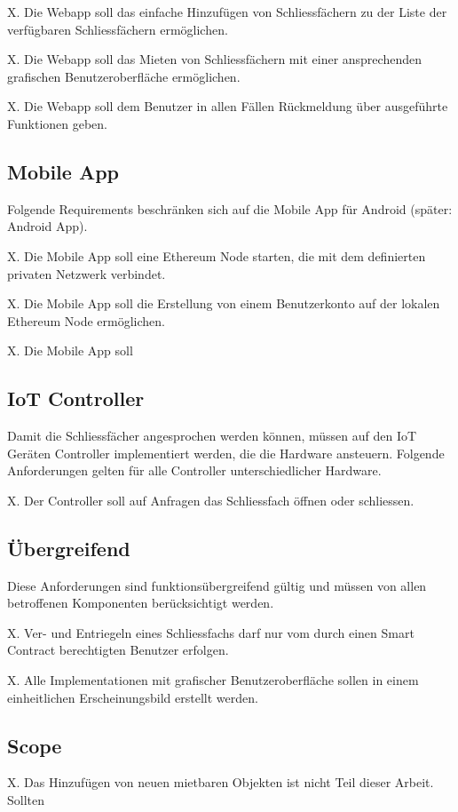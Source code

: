 X. Die Webapp soll das einfache Hinzufügen von Schliessfächern zu der Liste der verfügbaren Schliessfächern ermöglichen.

X. Die Webapp soll das Mieten von Schliessfächern mit einer ansprechenden grafischen Benutzeroberfläche ermöglichen.

X. Die Webapp soll dem Benutzer in allen Fällen Rückmeldung über ausgeführte Funktionen geben.

\subsection{Mobile App}
Folgende Requirements beschränken sich auf die Mobile App für Android (später: Android App).

X. Die Mobile App soll eine Ethereum Node starten, die mit dem definierten privaten Netzwerk verbindet.

X. Die Mobile App soll die Erstellung von einem Benutzerkonto auf der lokalen Ethereum Node ermöglichen.

X. Die Mobile App soll 

\subsection{IoT Controller}
Damit die Schliessfächer angesprochen werden können, müssen auf den IoT Geräten Controller implementiert werden, die die Hardware ansteuern. Folgende Anforderungen gelten für alle Controller unterschiedlicher Hardware.

X. Der Controller soll auf Anfragen das Schliessfach öffnen oder schliessen.

\subsection{Übergreifend}
Diese Anforderungen sind funktionsübergreifend gültig und müssen von allen betroffenen Komponenten berücksichtigt werden.

X. Ver- und Entriegeln eines Schliessfachs darf nur vom durch einen Smart Contract berechtigten Benutzer erfolgen.

X. Alle Implementationen mit grafischer Benutzeroberfläche sollen in einem einheitlichen Erscheinungsbild erstellt werden.

\subsection{Scope}
X. Das Hinzufügen von neuen mietbaren Objekten ist nicht Teil dieser Arbeit. Sollten

